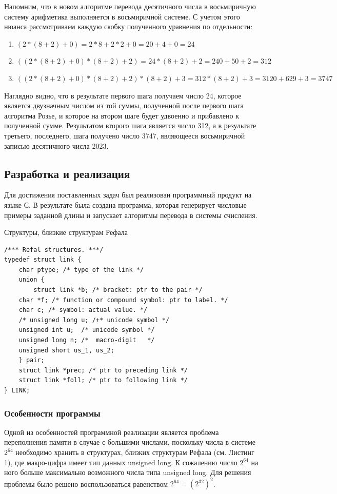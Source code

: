 \documentclass[14pt, russian]{scrartcl}
\begin{document}
Напомним, что в новом алгоритме перевода десятичного числа в восьмиричную систему арифметика выполняется в восьмиричной системе. С учетом этого нюанса рассмотриваем каждую скобку полученного уравнения по отдельности:
\begin{enumerate}
    \item $(2 * (8+2) + 0) = 2 * 8 + 2 * 2 + 0 = 20 + 4 + 0 = 24$
    \item $((2 * (8+2) + 0)*(8+2) + 2) = 24 *(8+2) + 2 = 240 + 50 + 2 = 312$
    \item $((2 * (8+2) + 0)*(8+2) + 2) * (8+2) + 3 = 312 * (8 + 2) + 3 = 3120 + 629 + 3 = 3747$
\end{enumerate}
Наглядно видно, что в результате первого шага получаем число 24, которое является двузначным числом из той суммы, полученной после первого шага алгоритма Розье, и которое на втором шаге будет удвоенно и прибавлено к полученной сумме. Результатом второго шага является число 312, а в результате третьего, последнего, шага получено число 3747, являющееся восьмиричной записью десятичного числа 2023.

\subsection{Разработка и реализация}
Для достижения поставленных задач был реализован программный продукт на языке С. В результате была создана программа, которая генерирует числовые примеры заданной длины и запускает алгоритмы перевода в системы счисления.
\begin{listing}
\caption{Структуры, близкие структурам Рефала}
\label{lst:refal}
\begin{verbatim}
/*** Refal structures. ***/
typedef struct link {
    char ptype; /* type of the link */  
    union {
        struct link *b; /* bracket: ptr to the pair */
    char *f; /* function or compound symbol: ptr to label. */
    char c; /* symbol: actual value. */
    /* unsigned long u; /+* unicode symbol */
    unsigned int u;  /* unicode symbol */
    unsigned long n; /*  macro-digit   */
    unsigned short us_1, us_2;
    } pair;
    struct link *prec; /* ptr to preceding link */
    struct link *foll; /* ptr to following link */
} LINK;
\end{verbatim}
\end{listing}

\subsubsection{Особенности программы}
Одной из особенностей программной реализации является проблема переполнения памяти в случае с большими числами, поскольку числа в системе $2^{64}$ необходимо хранить в структурах, близких структурам Рефала (см. Листинг 1), где макро-цифра имеет тип данных unsigned long. К сожалению число $2^{64}$ на ного больше максимально возможного числа типа unsigned long. Для решения проблемы было решено воспользоваться равенством $2^{64} = (2^{32})^2$. 
\end{document}
